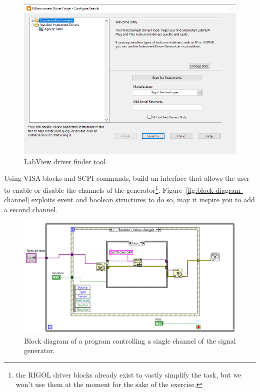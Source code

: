 \documentclass{labo}
\begin{document}
\begin{figure}[ht!]
\centering
\includegraphics[scale=.7]{LabView-driver-finder.png}
\caption{LabView driver finder tool.}
\label{fig:labview-driver-finder}
\end{figure}

Using VISA blocks and SCPI commands, build an interface that allows the user to enable or disable the channels of the generator\footnote{the RIGOL driver blocks already exist to vastly simplify the task, but we won't use them at the moment for the sake of the exercise.}.
Figure~\vref{fig:block-diagram-channel} exploits event and boolean structures to do so, may it inspire you to add a second channel.

\begin{figure}[ht!]
\centering
\includegraphics[width=\linewidth]{block-diagram-channel.png}
\caption{Block diagram of a program controlling a single channel of the signal generator.}
\label{fig:block-diagram-channel}
\end{figure}
\end{document}
